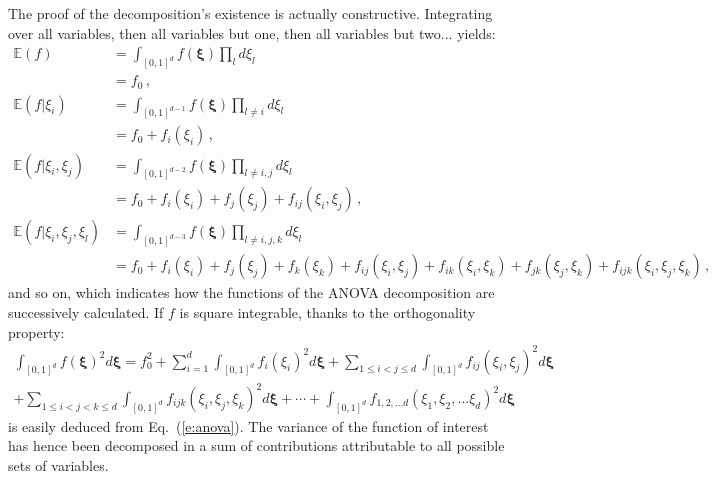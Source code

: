 \documentclass{eurosae}
\newcommand{\xigj}{\xi}
\newcommand{\xig}{{\boldsymbol\xi}}
\newcommand{\esp}{{\mathbb E}}
\newcommand{\eref}[1]{Eq.~(\ref{#1})}
\begin{document}
The proof of the decomposition's existence is actually constructive. Integrating over all variables, then all variables but one, then all variables but two... yields:
%   
\begin{displaymath}
\begin{split}
\esp(f) &= \int_{[0,1]^d} f(\xig)  \prod_l d\xigj_l \\
&= f_0\,, \\
%
\esp(f|\xigj_i) &=\int_{[0,1]^{d-1}} f(\xig) \prod_{l\neq i} d\xigj_l  \\
&= f_0 + f_i(\xigj_i)\,,\\
%
\esp(f|\xigj_i,\xigj_j)  &= \int_{[0,1]^{d-2}} f(\xig) \prod_{l\neq i,j} d\xigj_l \\
&= f_0 + f_i(\xigj_i) + f_j(\xigj_j) + f_{ij}(\xigj_i,\xigj_j)\,, \\
%
\esp(f|\xigj_i,\xigj_j,\xigj_l) &=  \int_{[0,1]^{d-3}} f(\xig) \prod_{l\neq i,j,k} d\xigj_l \\
&= f_0 + f_i(\xigj_i) + f_j(\xigj_j) + f_k(\xigj_k) + f_{ij}(\xigj_i,\xigj_j) + f_{ik}(\xigj_i,\xigj_k) + f_{jk}(\xigj_j,\xigj_k) + f_{ijk}(\xigj_i,\xigj_j,\xigj_k)\,,
%
\end{split}
\end{displaymath}
%
and so on, which indicates how the functions of the ANOVA decomposition are successively calculated. If $f$ is square integrable, thanks to the orthogonality property:
%
\begin{multline}\label{e:ana2}
   \int_{[0,1]^d} f(\xig)^2 d\xig  =  f_0^2 + \sum_{i=1}^d \int_{[0,1]^d} f_i(\xigj_i)^2 d\xig + \sum_{1\leq i<j\leq d} \int_{[0,1]^d}  f_{ij}(\xigj_i,\xigj_j)^2 d\xig \\
  + \sum_{1\leq i<j<k\leq d}\int_{[0,1]^d}  f_{ijk}(\xigj_i,\xigj_j,\xigj_k)^2 d\xig +\cdots + \int_{[0,1]^d} f_{1,2,\dots d} (\xigj_1,\xigj_2,\dots\xigj_d)^2 d\xig
\end{multline}
%
is easily deduced from \eref{e:anova}. The variance of the function of interest has hence been decomposed in a sum of contributions attributable to all possible sets of variables.
%
\end{document}
